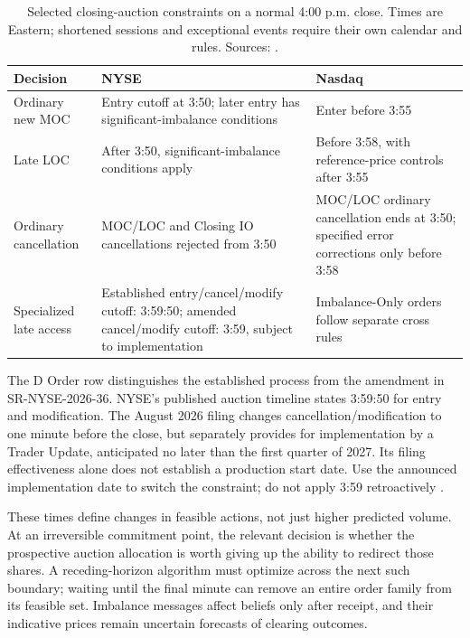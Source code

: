 \documentclass[11pt]{article}
\numberwithin{equation}{section}
\theoremstyle{definition}
\theoremstyle{remark}
\theoremstyle{definition}
\begin{document}
\begin{table}[tb]
\centering\small
\caption{Selected closing-auction constraints on a normal 4:00 p.m. close.
Times are Eastern; shortened sessions and exceptional events require their own
calendar and rules. Sources: \citet{nyseauctions,nysecloserule,nasdaqrules}.}
\label{tab:closedeadlines}
\begin{tabularx}{\textwidth}{p{}YY}
\toprule Decision & NYSE & Nasdaq \\\midrule
Ordinary new MOC & Entry cutoff at 3:50; later entry has significant-imbalance conditions & Enter before 3:55 \\
Late LOC & After 3:50, significant-imbalance conditions apply & Before 3:58, with reference-price controls after 3:55 \\
Ordinary cancellation & MOC/LOC and Closing IO cancellations rejected from 3:50 & MOC/LOC ordinary cancellation ends at 3:50; specified error corrections only before 3:58 \\
Specialized late access & Established entry/cancel/modify cutoff: 3:59:50; amended cancel/modify cutoff: 3:59, subject to implementation & Imbalance-Only orders follow separate cross rules \\
\bottomrule
\end{tabularx}
\end{table}

The D Order row distinguishes the established process from the amendment
in SR-NYSE-2026-36. NYSE's published auction timeline states 3:59:50 for entry
and modification. The August 2026 filing changes cancellation/modification to
one minute before the close, but separately provides for implementation by a
Trader Update, anticipated no later than the first quarter of 2027. Its filing
effectiveness alone does not establish a production start date. Use the
announced implementation date to switch the constraint; do not apply 3:59
retroactively \citep{nyseauctions,nyse2026implementation}.

These times define changes in feasible actions, not just higher predicted
volume. At an irreversible commitment point, the relevant decision is whether
the prospective auction allocation is worth giving up the ability to redirect
those shares. A receding-horizon algorithm must optimize across the next such
boundary; waiting until the final minute can remove an entire order family
from its feasible set. Imbalance messages affect beliefs only after receipt,
and their indicative prices remain uncertain forecasts of clearing outcomes.
\end{document}
